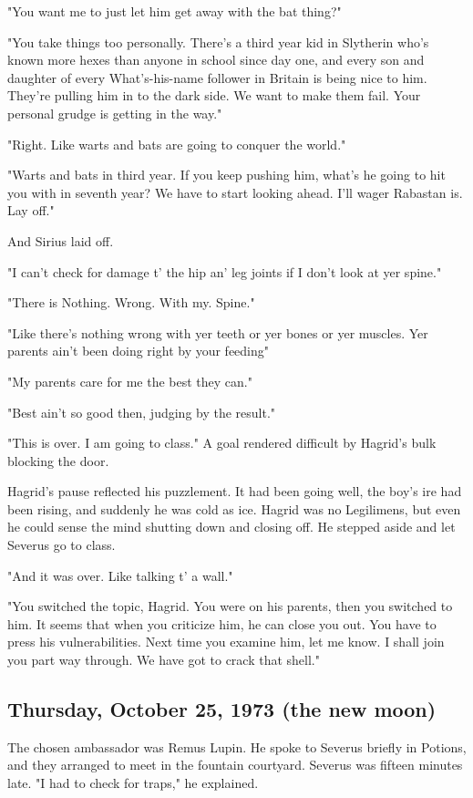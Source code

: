"You want me to just let him get away with the bat thing?"

"You take things too personally. There's a third year kid in Slytherin who's known more hexes than anyone in school since day one, and every son and daughter of every What's-his-name follower in Britain is being nice to him. They're pulling him in to the dark side. We want to make them fail. Your personal grudge is getting in the way."

"Right. Like warts and bats are going to conquer the world."

"Warts and bats in third year. If you keep pushing him, what's he going to hit you with in seventh year? We have to start looking ahead. I'll wager Rabastan is. Lay off."

And Sirius laid off.

"I can't check for damage t' the hip an' leg joints if I don't look at yer spine."

"There is Nothing. Wrong. With my. Spine."

"Like there's nothing wrong with yer teeth or yer bones or yer muscles. Yer parents ain't been doing right by your feeding{\el}"

"My parents care for me the best they can."

"Best ain't so good then, judging by the result."

"This is over. I am going to class." A goal rendered difficult by Hagrid's bulk blocking the door.

Hagrid's pause reflected his puzzlement. It had been going well, the boy's ire had been rising, and suddenly he was cold as ice. Hagrid was no Legilimens, but even he could sense the mind shutting down and closing off. He stepped aside and let Severus go to class.

"And it was over. Like talking t' a wall."

"You switched the topic, Hagrid. You were on his parents, then you switched to him. It seems that when you criticize him, he can close you out. You have to press his vulnerabilities. Next time you examine him, let me know. I shall join you part way through. We have got to crack that shell."

\subsection{Thursday, October 25, 1973 (the new moon)}

The chosen ambassador was Remus Lupin. He spoke to Severus briefly in Potions, and they arranged to meet in the fountain courtyard. Severus was fifteen minutes late. "I had to check for traps," he explained.

